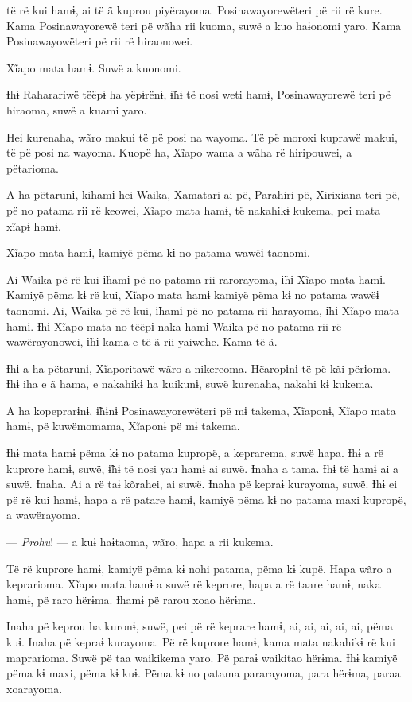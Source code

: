 të rë kui hamɨ, ai të ã kuprou piyërayoma. Posinawayorewëteri pë rii
rë kure. Kama Posinawayorewë teri pë wãha rii kuoma, suwë a kuo haɨonomi
yaro. Kama Posinawayowëteri pë rii rë hiraonowei. 

Xĩapo mata hamɨ. Suwë a kuonomi. 

Ɨhɨ Raharariwë tëëpɨ ha yëpɨrënɨ, ɨ̃hɨ të nosi weti hamɨ, Posinawayorewë
teri pë hiraoma, suwë a kuami yaro. 

Hei kurenaha, wãro makui të pë posi na wayoma. Të pë moroxi kuprawë
makui, të pë posi na wayoma. Kuopë ha, Xĩapo wama a wãha rë hiripouwei,
a pëtarioma. 

A ha pëtarunɨ, kihamɨ hei Waika, Xamatari ai pë, Parahiri pë, Xirixiana
teri pë, pë no patama rii rë keowei, Xĩapo mata hamɨ, të nakahikɨ
kukema, pei mata xĩapɨ hamɨ. 

Xĩapo mata hamɨ, kamiyë pëma kɨ no patama wawëɨ taonomi.

Ai Waika pë rë kui ɨ̃hamɨ pë no patama rii rarorayoma, ɨ̃hɨ Xĩapo mata
hamɨ. Kamiyë pëma kɨ rë kui, Xĩapo mata hamɨ kamiyë pëma kɨ no patama
wawëɨ taonomi. Ai, Waika pë rë kui, ɨ̃hamɨ pë no patama rii harayoma, ɨ̃hɨ
Xĩapo mata hamɨ. Ɨhɨ Xĩapo mata no tëëpɨ naka hamɨ Waika pë no patama
rii rë wawërayonowei, ɨ̃hɨ kama e të ã rii yaiwehe. Kama të ã. 

Ɨhɨ a ha pëtarunɨ, Xĩaporitawë wãro a nikereoma. Hẽaropɨnɨ të pë kãi
përɨoma. Ɨhɨ iha e ã hama, e nakahikɨ ha kuikunɨ, suwë kurenaha, nakahi
kɨ kukema. 

A ha kopeprarɨnɨ, ɨ̃hɨnɨ Posinawayorewëteri pë mɨ takema, Xĩaponɨ, Xĩapo
 mata hamɨ, pë kuwëmomama, Xĩaponɨ pë mɨ takema.

Ɨhɨ mata hamɨ pëma kɨ no patama kupropë, a keprarema, suwë hapa. Ɨhɨ a
rë kuprore hamɨ, suwë, ɨ̃hɨ të nosi yau hamɨ ai suwë. Ɨnaha a tama. Ɨhɨ
të hamɨ ai a suwë. Ɨnaha. Ai a rë taɨ kõrahei, ai suwë. Ɨnaha pë kepraɨ
kurayoma, suwë. Ɨhɨ ei pë rë kui hamɨ, hapa a rë patare hamɨ, kamiyë
pëma kɨ no patama maxi kupropë, a wawërayoma. 

--- \textit{Prohu}! --- a kuɨ haɨtaoma, wãro, hapa a rii kukema. 

Të rë kuprore hamɨ, kamiyë pëma kɨ nohi patama, pëma kɨ kupë. Hapa wãro
a keprarioma. Xĩapo mata hamɨ a suwë rë keprore, hapa a rë taare hamɨ,
naka hamɨ, pë raro hërɨma. Ɨhamɨ pë rarou xoao hërɨma. 

Ɨnaha pë keprou ha kuronɨ, suwë, pei pë rë keprare hamɨ, ai, ai, ai, ai,
ai, pëma kuɨ. Ɨnaha pë kepraɨ kurayoma. Pë rë kuprore hamɨ, kama mata
nakahikɨ rë kui maprarioma. Suwë pë taa waikikema yaro. Pë paraɨ
waikitao hërɨma. Ɨhɨ kamiyë pëma kɨ maxi, pëma kɨ kuɨ. Pëma kɨ no patama
pararayoma, para hërɨma, paraa xoarayoma. 

